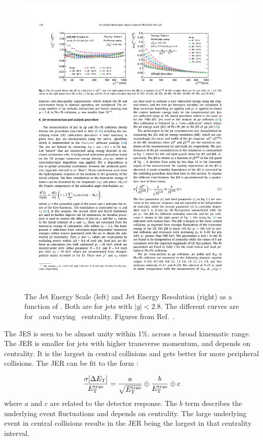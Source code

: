\begin{figure}[htbp!]
	\centering
	\includegraphics[width=\textwidth]{figures/setup/jes_jer} %
	\caption{
	The Jet Energy Scale (left) and Jet Energy Resolution (right) as a function of \pttruth.
	Both are for jets with $|y| < 2.8$. The different curves are for \pp\ and varying \pbpb\ centrality.
	Figures from Ref.~\cite{2019108}.}	
	\label{fig:jes_jer}%
\end{figure}
The JES is seen to be almost unity within 1\%. across a broad kinematic range.
The JER is smaller for jets with higher transverse momentum, and depends on centrality.
It is the largest in central collisions and gets better for more peripheral collisions.
The JER can be fit to the form \cite{Aad:hi_jets}:

\begin{align}
\frac{\sigma[\Delta \mbox{$E_{\mathrm{T}}$}]}{E_{\rm T}^{\rm true}} = \frac{a}{\sqrt{E_{\rm T}^{\rm true}}} \oplus \frac{b}{E_{\rm T}^{\rm true}} \oplus c
\end{align}
where $a$ and $c$ are related to the detector response.
The $b$ term describes the underlying event fluctuations and depends on centrality.
The large underlying event in central collisions results in the JER being the largest in that centrality interval. 

